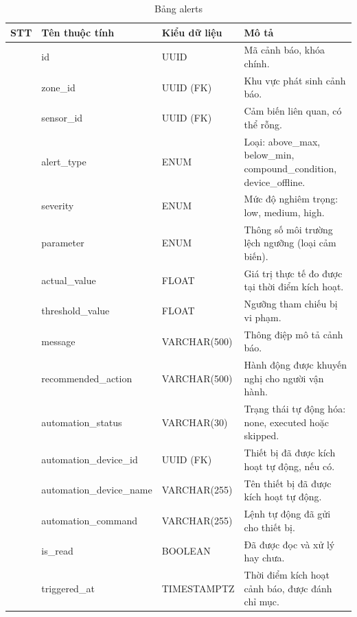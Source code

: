 \documentclass[13pt,a4paper]{extarticle}
\numberwithin{figure}{section}
\numberwithin{table}{section}
\begin{document}
	\begin{table}[H]
		\centering
		\caption{Bảng alerts}
		\label{tab:alerts}
		\begingroup
		\setlength{\tabcolsep}{3pt}
		\begin{tabularx}{\textwidth}{|>{\centering\arraybackslash}p{1cm}|>{\raggedright\arraybackslash}p{3.8cm}|>{\raggedright\arraybackslash}p{3.2cm}|Y|}
			\hline
			\centering\textbf{STT} & \centering\textbf{Tên thuộc tính} & \centering\textbf{Kiểu dữ liệu} & \centering\arraybackslash\textbf{Mô tả} \\
			 & id & UUID & Mã cảnh báo, khóa chính. \\
			 & zone\_id & UUID (FK) & Khu vực phát sinh cảnh báo. \\
			 & sensor\_id & UUID (FK) & Cảm biến liên quan, có thể rỗng. \\
			 & alert\_type & ENUM & Loại: above\_max, below\_min, compound\_condition, device\_offline. \\
			 & severity & ENUM & Mức độ nghiêm trọng: low, medium, high. \\
			 & parameter & ENUM & Thông số môi trường lệch ngưỡng (loại cảm biến). \\
			 & actual\_value & FLOAT & Giá trị thực tế đo được tại thời điểm kích hoạt. \\
			 & threshold\_value & FLOAT & Ngưỡng tham chiếu bị vi phạm. \\
			 & message & VARCHAR(500) & Thông điệp mô tả cảnh báo. \\
			 & recommended\_action & VARCHAR(500) & Hành động được khuyến nghị cho người vận hành. \\
			 & automation\_status & VARCHAR(30) & Trạng thái tự động hóa: none, executed hoặc skipped. \\
			 & automation\_device\_id & UUID (FK) & Thiết bị đã được kích hoạt tự động, nếu có. \\
			 & automation\_device\_name & VARCHAR(255) & Tên thiết bị đã được kích hoạt tự động. \\
			 & automation\_command & VARCHAR(255) & Lệnh tự động đã gửi cho thiết bị. \\
			 & is\_read & BOOLEAN & Đã được đọc và xử lý hay chưa. \\
			 & triggered\_at & TIMESTAMPTZ & Thời điểm kích hoạt cảnh báo, được đánh chỉ mục. \\
			\hline
		\end{tabularx}
		\endgroup
	\end{table}
	
\end{document}
